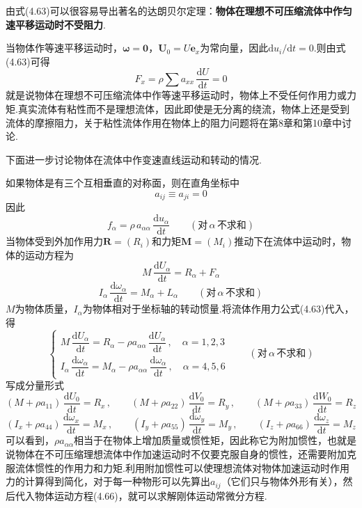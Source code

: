 由式(4.63)可以很容易导出著名的达朗贝尔定理：\textbf{物体在理想不可压缩流体中作匀速平移运动时不受阻力}.

当物体作等速平移运动时，$\boldsymbol{\omega}=\boldsymbol{0}$，$\boldsymbol{U}_0=U\boldsymbol{e}_x$为常向量，因此$\mathrm{d}u_i/\mathrm{d}t=0$.则由式(4.63)可得
\[
F_x=\rho\sum a_{xx}\,\frac{\mathrm{d}U}{\mathrm{d}t}=0
\]
就是说物体在理想不可压缩流体中作等速平移运动时，物体上不受任何作用力或力矩.真实流体有粘性而不是理想流体，因此即使是无分离的绕流，物体上还是受到流体的摩擦阻力，关于粘性流体作用在物体上的阻力问题将在第8章和第10章中讨论.

下面进一步讨论物体在流体中作变速直线运动和转动的情况.

如果物体是有三个互相垂直的对称面，则在直角坐标中
\[
a_{ij}\equiv a_{ji}=0
\]
因此
\[
f_\alpha=\rho\,a_{\alpha\alpha}\,\frac{\mathrm{d}u_\alpha}{\mathrm{d}t}\qquad(\text{对}\,\alpha\,\text{不求和})
\]
当物体受到外加作用力$\boldsymbol{R}=(R_i)$和力矩$\boldsymbol{M}=(M_i)$推动下在流体中运动时，物体的运动方程为
\begin{equation*}
M\,\frac{\mathrm{d}U_\alpha}{\mathrm{d}t}=R_\alpha+F_\alpha
\tag{4.64}
\end{equation*}
\begin{equation*}
I_\alpha\,\frac{\mathrm{d}\omega_\alpha}{\mathrm{d}t}=M_\alpha+L_\alpha\qquad(\text{对}\,\alpha\,\text{不求和})
\tag{4.65}
\end{equation*}
$M$为物体质量，$I_\alpha$为物体相对于坐标轴的转动惯量.将流体作用力公式(4.63)代入，得
\begin{equation*}
\begin{cases}
M\,\dfrac{\mathrm{d}U_\alpha}{\mathrm{d}t}=R_\alpha-\rho a_{\alpha\alpha}\,\dfrac{\mathrm{d}U_\alpha}{\mathrm{d}t}\,,\quad \alpha=1,2,3\\[8pt]
I_\alpha\,\dfrac{\mathrm{d}\omega_\alpha}{\mathrm{d}t}=M_\alpha-\rho a_{\alpha\alpha}\,\dfrac{\mathrm{d}\omega_\alpha}{\mathrm{d}t}\,,\quad \alpha=4,5,6
\end{cases}
\qquad(\text{对}\,\alpha\,\text{不求和})
\tag{4.66}
\end{equation*}
写成分量形式
\[
(M+\rho a_{11})\,\frac{\mathrm{d}U_0}{\mathrm{d}t}=R_x\,,\qquad (M+\rho a_{22})\,\frac{\mathrm{d}V_0}{\mathrm{d}t}=R_y\,,\qquad (M+\rho a_{33})\,\frac{\mathrm{d}W_0}{\mathrm{d}t}=R_z
\]
\[
(I_x+\rho a_{44})\,\frac{\mathrm{d}\omega_x}{\mathrm{d}t}=M_x\,,\qquad (I_y+\rho a_{55})\,\frac{\mathrm{d}\omega_y}{\mathrm{d}t}=M_y\,,\qquad (I_z+\rho a_{66})\,\frac{\mathrm{d}\omega_z}{\mathrm{d}t}=M_z
\]
可以看到，$\rho a_{\alpha\alpha}$相当于在物体上增加质量或惯性矩，因此称它为附加惯性，也就是说物体在不可压缩理想流体中作加速运动时不仅要克服自身的惯性，还需要附加克服流体惯性的作用力和力矩.利用附加惯性可以使理想流体对物体加速运动时作用力的计算得到简化，对于每一种物形可以先算出$a_{ij}$（它们只与物体外形有关），然后代入物体运动方程(4.66)，就可以求解刚体运动常微分方程.

